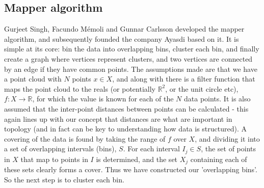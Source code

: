 \documentclass[a4paper]{article}
\begin{document}
\subsection*{Mapper algorithm}
Gurjeet Singh, Facundo Mémoli and Gunnar Carlsson developed the mapper algorithm, and subsequently founded the company Ayasdi based on it. It is simple at its core: bin the data into overlapping bins, cluster each bin, and finally create a graph where vertices represent clusters, and two vertices are connected by an edge if they have common points. The assumptions made are that we have a point cloud with $N$ points $x \in X$, and along with there is a filter function that maps the point cloud to the reals (or potentially $\mathbb{R}^{2}$, or the unit circle etc), $f: X \to \mathbb{R}$, for which the value is known for each of the $N$ data points. It is also assumed that the inter-point distances between points can be calculated - this again lines up with our concept that distances are what are important in topology (and in fact can be key to understanding how data is structured). A covering of the data is found by taking the range of $f$ over $X$, and dividing it into a set of overlapping intervals (bins), $S$. For each interval $I_{j} \in S$, the set of points in $X$ that map to points in $I$ is determined, and the set ${X_{j}}$ containing each of these sets clearly forms a cover. Thus we have constructed our 'overlapping bins'. So the next step is to cluster each bin.
\end{document}
